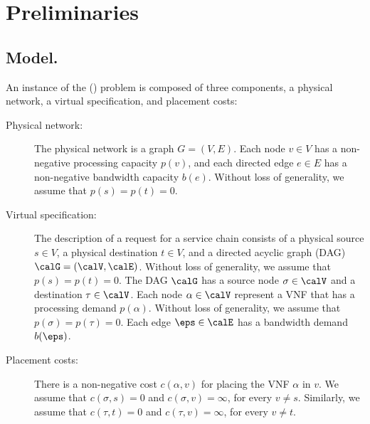 
\section{Preliminaries}

\subsection*{Model.}
%
An instance of the \scplong (\scp) problem is composed of three
components, a physical network, a virtual specification, and placement
costs:
\begin{description}
\item[Physical network:]
%
  The physical network is a graph $G = (V,E)$.  Each node $v \in V$
  has a non-negative processing capacity $p(v)$, and each directed
  edge $e \in E$ has a non-negative bandwidth capacity $b(e)$.
%
  Without loss of generality, we assume that $p(s) = p(t) = 0$.  

\medskip
  
\item[Virtual specification:]
%
  The description of a request for a service chain consists of a
  physical source $s \in V$, a physical destination $t \in V$, and a
  directed acyclic graph (DAG) $\calG = (\calV,\calE)$.
%
  Without loss of generality, we assume that $p(s) = p(t) = 0$.  
%
  The DAG $\calG$ has a source node $\sigma \in \calV$ and a
  destination $\tau \in \calV$. Each node $\alpha \in \calV$ represent
  a VNF that has a processing demand $p(\alpha)$.
%
  Without loss of generality, we assume that $p(\sigma) = p(\tau) =
  0$.  Each edge $\eps \in \calE$ has a bandwidth demand $b(\eps)$.

\medskip
  
\item[Placement costs:]
%
  There is a non-negative cost $c(\alpha,v)$ for placing the VNF
  $\alpha$ in $v$.  We assume that $c(\sigma,s) = 0$ and $c(\sigma,v)
  = \infty$, for every $v \neq s$.  Similarly, we assume that
  $c(\tau,t) = 0$ and $c(\tau,v) = \infty$, for every $v \neq t$.
\end{description}

